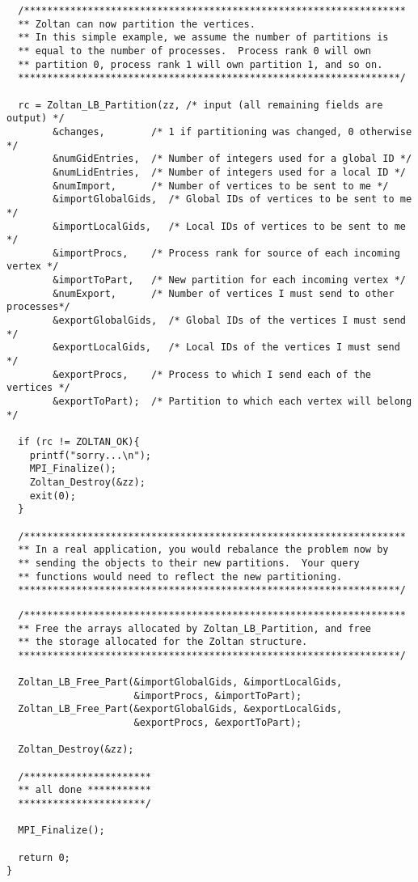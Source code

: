 \clearpage
\begin{flushleft}
\begin{verbatim}
  /******************************************************************
  ** Zoltan can now partition the vertices.
  ** In this simple example, we assume the number of partitions is
  ** equal to the number of processes.  Process rank 0 will own
  ** partition 0, process rank 1 will own partition 1, and so on.
  ******************************************************************/

  rc = Zoltan_LB_Partition(zz, /* input (all remaining fields are output) */
        &changes,        /* 1 if partitioning was changed, 0 otherwise */ 
        &numGidEntries,  /* Number of integers used for a global ID */
        &numLidEntries,  /* Number of integers used for a local ID */
        &numImport,      /* Number of vertices to be sent to me */
        &importGlobalGids,  /* Global IDs of vertices to be sent to me */
        &importLocalGids,   /* Local IDs of vertices to be sent to me */
        &importProcs,    /* Process rank for source of each incoming vertex */
        &importToPart,   /* New partition for each incoming vertex */
        &numExport,      /* Number of vertices I must send to other processes*/
        &exportGlobalGids,  /* Global IDs of the vertices I must send */
        &exportLocalGids,   /* Local IDs of the vertices I must send */
        &exportProcs,    /* Process to which I send each of the vertices */
        &exportToPart);  /* Partition to which each vertex will belong */

  if (rc != ZOLTAN_OK){
    printf("sorry...\n");
    MPI_Finalize();
    Zoltan_Destroy(&zz);
    exit(0);
  }

  /******************************************************************
  ** In a real application, you would rebalance the problem now by
  ** sending the objects to their new partitions.  Your query 
  ** functions would need to reflect the new partitioning.
  ******************************************************************/
\end{verbatim}
\end{flushleft}

\clearpage
\begin{flushleft}
\begin{verbatim}
  /******************************************************************
  ** Free the arrays allocated by Zoltan_LB_Partition, and free
  ** the storage allocated for the Zoltan structure.
  ******************************************************************/

  Zoltan_LB_Free_Part(&importGlobalGids, &importLocalGids, 
                      &importProcs, &importToPart);
  Zoltan_LB_Free_Part(&exportGlobalGids, &exportLocalGids, 
                      &exportProcs, &exportToPart);

  Zoltan_Destroy(&zz);

  /**********************
  ** all done ***********
  **********************/

  MPI_Finalize();

  return 0;
}
\end{verbatim}
\end{flushleft}
